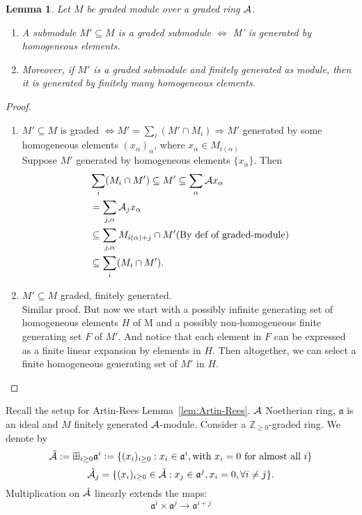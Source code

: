 \documentclass[11pt]{article}
\newtheorem{lemma}[thm]{Lemma}
\newcommand{\intg}{\mathbb Z}
\newcommand{\sca}{{\mathfrak a}}
\newcommand{\cala}{{\cal A}}
\newcommand{\Lrta}{\Longrightarrow}
\newcommand{\lrta}{\longrightarrow}
\newcommand{\Llrta}{\Longleftrightarrow}
\begin{document}
\begin{lemma}
Let $M$ be graded module over a graded ring $\cala$. 
\begin{enumerate}[label=(\roman*)]
\item A submodule $M'\subseteq M$ is a graded submodule $\Llrta$ M' is generated by homogeneous elements. 
\item Moreover, if $M'$ is a graded submodule and finitely generated as module, then it is generated by finitely many homogeneous elements.
\end{enumerate}
\end{lemma}
\begin{proof}
\begin{enumerate}[label=(\roman*)]
\item $M'\subseteq M$ is graded $\Llrta M'=\sum_i(M'\cap M_i)\Lrta M'$ generated by some homogeneous elements $(x_\alpha)_\alpha$, where $x_\alpha\in M_{i(\alpha)}$\\
Suppose $M'$ generated by homogeneous elements $\{x_\alpha\}$. Then
$$
\begin{aligned}
&\sum_i(M_i\cap M')\subseteq M'\subseteq \sum_\alpha\cala x_\alpha\\
&=\sum_{j,\alpha}\cala_j x_\alpha\\
&\subseteq\sum_{j,\alpha} M_{i(\alpha)+j}\cap M'(\text{By def of graded-module})\\
&\subseteq \sum_i (M_i\cap M').
\end{aligned}
$$
\item $M'\subseteq M$ graded, finitely generated.\\
Similar proof. But now we start with a possibly infinite generating set of homogeneous elements $H$ of M and a possibly non-homogeneous finite generating set $F$ of $M'$. And notice that each element in $F$ can be expressed as a finite linear expansion by elements in $H$. Then altogether, we can select a finite homogeneous generating set of $M'$ in $H$. 
\end{enumerate}
\end{proof}

Recall the setup for Artin-Rees Lemma~\ref{lem:Artin-Rees}. $\cala$ Noetherian ring, $\sca$ is an ideal and $M$ finitely generated $\cala$-module. Consider a $\intg_{\geq 0}$-graded ring. We denote by
$$
\tilde{\cala}:=\boxplus_{i\geq 0}\sca^i:=\{(x_i)_{i\geq 0}:x_i\in \sca^i, \text{with }x_i=0 \text{ for almost all }i\}
$$
$$\tilde{\cala}_j=\{(x_i)_{i\geq 0}\in \tilde{\cala}: x_j\in\sca^j, x_i=0, \forall i\neq j\}.$$
Multiplication on $\tilde{\cala}$ linearly extends the maps:
$$
\sca^i\times \sca^j\lrta \sca^{i+j}
$$
\end{document}
